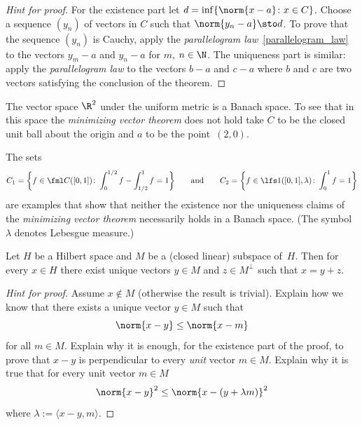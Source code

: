 \begin{proof}[\emph{Hint for proof}]  For the existence part let $d = \inf\{\norm{x - a}\colon x \in C\}$.  Choose a sequence
$(y_n)$ of vectors in $C$ such that $\norm{y_n - a} \sto d$.  To prove that the sequence $(y_n)$ is Cauchy, apply the
\emph{parallelogram law}~\ref{parallelogram_law} to the vectors $y_m - a$ and $y_n - a$ for $m$, $n \in \N$.  The uniqueness
part is similar: apply the \emph{parallelogram law} to the vectors $b - a$ and $c - a$ where $b$ and $c$ are two vectors
satisfying the conclusion of the theorem.  \ns
\end{proof}

\begin{exam} The vector space $\R^2$ under the uniform metric is a Banach space. To see
that in this space the \emph{minimizing vector theorem} does not hold take $C$ to be the
closed unit ball about the origin and $a$ to be the point~$(2,0)$.
\end{exam}

\begin{exam} The sets
   \[ C_1 = \biggl\{f \in \fml C([0,1])\colon \int_0^{1/2}f - \int_{1/2}^1f = 1\biggr\} \qquad \text{and} \qquad
                              C_2 = \biggl\{f \in \lfs 1([0,1],\lambda)\colon \int_0^1f = 1\biggr\} \]
are examples that show that neither the existence nor the uniqueness claims of the \emph{minimizing vector theorem}
necessarily holds in a Banach space. (The symbol $\lambda$ denotes Lebesgue measure.)
\end{exam}

\begin{thm}\label{thm_vec_decomp} Let $H$ be a Hilbert space and
$M$ be a (closed linear) subspace of~$H$.
Then for every $x \in H$ there exist unique vectors $y \in M$ and $z \in M^\perp$ such that $x = y + z$.
\end{thm}

\begin{proof}[\emph{Hint for proof}] Assume $x \notin M$ (otherwise the result is trivial). Explain how we
know that there exists a unique vector $y \in M$ such that
   \begin{equation} \norm{x - y} \le \norm{x - m} \end{equation}
for all $m \in M$.  Explain why it is enough, for the existence part of the proof, to prove
that $x - y$ is perpendicular to every \emph{unit} vector $m \in M$.  Explain why it is true
that for every unit vector $m \in M$
   \begin{equation} \norm{x - y}^2 \le \norm{x - (y + \lambda m)}^2 \end{equation}
where $\lambda := \langle x - y, m \rangle$.  \ns
\end{proof}

